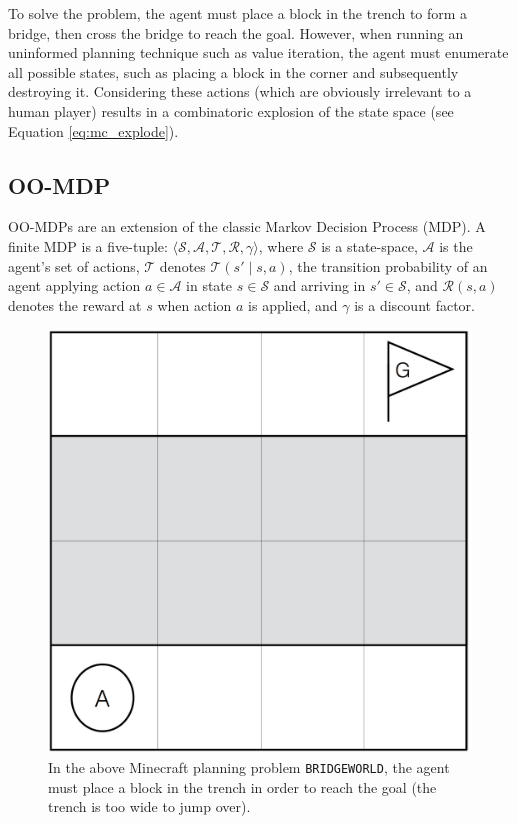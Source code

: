 \documentclass[]{article}
\begin{document}
To solve the problem, the agent must
place a block in the trench to form a bridge, then cross the bridge
to reach the goal.  However, when running an uninformed planning
technique such as value iteration, the agent must enumerate all
possible states, such as placing a block in the corner and
subsequently destroying it.  Considering these actions (which are
obviously irrelevant to a human player) results in a combinatoric
explosion of the state space (see Equation \ref{eq:mc_explode}).

\subsection{OO-MDP}

OO-MDPs are an extension of the classic Markov Decision Process (MDP).
A finite MDP is a five-tuple: $\langle \mathcal{S}, \mathcal{A},
\mathcal{T}, \mathcal{R}, \gamma \rangle$, where $\mathcal{S}$ is a
state-space, $\mathcal{A}$ is the agent's set of actions,
$\mathcal{T}$ denotes $\mathcal{T}(s' \mid s,a)$, the transition
probability of an agent applying action $a \in \mathcal{A}$ in state
$s \in \mathcal{S}$ and arriving in $s' \in \mathcal{S}$, and
$\mathcal{R}(s,a)$ denotes the reward at $s$ when action $a$ is
applied, and $\gamma$ is a discount factor.

\begin{figure}
\centering
\includegraphics[scale=0.2]{figures/bridgeworld.png}
\caption{In the above Minecraft planning problem \texttt{BRIDGEWORLD},
the agent must place a block in the trench in order to reach the goal 
(the trench is too wide to jump over). \label{fig:bridgeworld}}
\end{figure}
\end{document}
